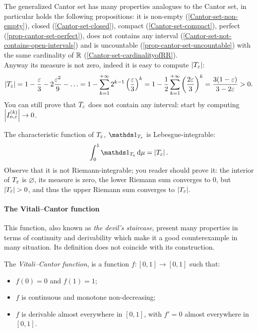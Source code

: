 The generalized Cantor set has many properties analogues to the Cantor set, in particular holds the following propositions:
it is non-empty (\vref{Cantor-set-non-empty}), closed (\vref{Cantor-set-closed}), compact (\vref{Cantor-set-compact}), perfect (\vref{prop-cantor-set-perfect}), does not contains any interval (\vref{Cantor-set-not-contains-open-intervals}) and is uncountable (\vref{prop-cantor-set-uncountable}) with the same cardinality of $\mathbb R$ (\vref{Cantor-set-cardinalityofRR}).\\
Anyway its measure is not zero, indeed it is easy to compute $|T_\varepsilon|$:
$$
\left|T_\varepsilon\right| 
= 1 - \frac {\varepsilon} 3 - 2 \frac {\varepsilon^2} 9 - \ldots
= 1 - \sum_{k=1}^{+\infty} 2^{k-1} \left( \frac {\varepsilon} 3 \right)^k
= 1 - \frac 1 2 \sum_{k=1}^{+\infty} \left( \frac {2\varepsilon} 3 \right)^k
= \frac{3(1 - \varepsilon)}{3 - 2\varepsilon} 
> 0
.
$$
You can still prove that $T_\varepsilon$ does not contain any interval: start by computing $\left|I_{n,\varepsilon}^{(k)}\right| \to 0$.

The characteristic function of $T_\varepsilon$, $\Ind_{T_\eps}$ is Lebesgue-integrable:
$$\int_0^1 \Ind_{T_\eps} \, \de \mu = \left|T_\eps\right|.$$ 
Observe that it is not Riemann-integrable; you reader should prove it: the interior of $T_\varepsilon$ is $\varnothing$, its measure is zero, the lower Riemann sum converges to 0, but $\left|T_\varepsilon\right| > 0$, and thus the upper Riemann sum converges to $\left|T_\varepsilon\right|$.

\paragraph{The Vitali--Cantor function} This function, also known as \textit{the devil's staircase}, present many properties in terms of continuity and derivability which make it a good counterexample in many situation. Its definition does not coincide with its construction. 

\begin{defn}\label{Vitali-Cantor-function}
	The \emph{Vitali--Cantor function}, is a function $f: [0, 1] \to [0, 1]$ such that:
	\begin{itemize}
		\item $f(0) = 0$ and $f(1) = 1$;
		\item $f$ is continuous and monotone non-decreasing;
		\item $f$ is derivable almost everywhere in $[0, 1]$, with $f' = 0$ almost everywhere in $[0, 1]$.
	\end{itemize}
\end{defn}


